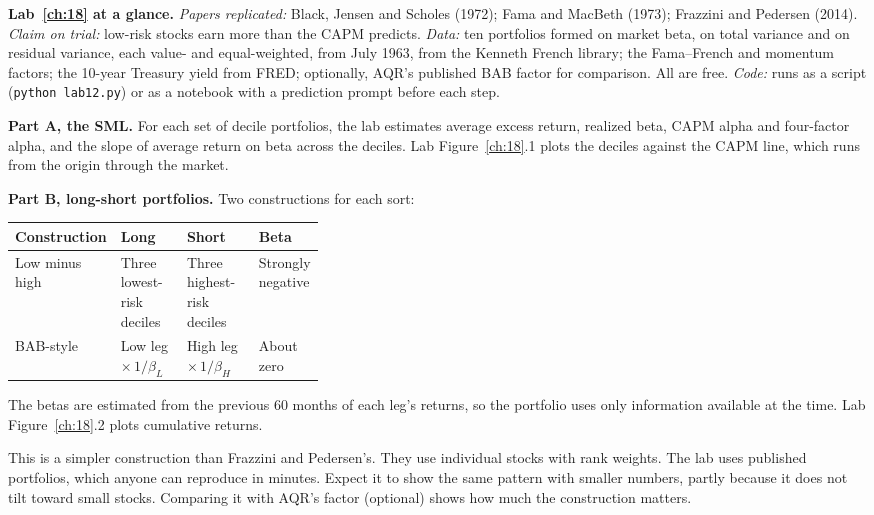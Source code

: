 \begin{callout}
\textbf{Lab~\ref{ch:18} at a glance.} \emph{Papers replicated:} Black, Jensen and Scholes (1972); Fama and MacBeth (1973); Frazzini and Pedersen (2014). \emph{Claim on trial:} low-risk stocks earn more than the CAPM predicts. \emph{Data:} ten portfolios formed on market beta, on total variance and on residual variance, each value- and equal-weighted, from July 1963, from the Kenneth French library; the Fama--French and momentum factors; the 10-year Treasury yield from FRED; optionally, AQR's published BAB factor for comparison. All are free. \emph{Code:} runs as a script (\texttt{python lab12.py}) or as a notebook with a prediction prompt before each step.
\end{callout}

\textbf{Part A, the SML.} For each set of decile portfolios, the lab estimates average excess return, realized beta, CAPM alpha and four-factor alpha, and the slope of average return on beta across the deciles. Lab Figure~\ref{ch:18}.1 plots the deciles against the CAPM line, which runs from the origin through the market.

\textbf{Part B, long-short portfolios.} Two constructions for each sort:

\begin{center}
\small
\begin{tabularx}{0.9\linewidth}{@{}>{\raggedright\arraybackslash}p{0.19\linewidth}>{\raggedright\arraybackslash}X>{\raggedright\arraybackslash}X>{\raggedright\arraybackslash}p{0.17\linewidth}@{}}
\toprule
Construction & Long & Short & Beta \\
\midrule
Low minus high & Three lowest-risk deciles & Three highest-risk deciles & Strongly negative \\
BAB-style & Low leg $\times\, 1/\beta_L$ & High leg $\times\, 1/\beta_H$ & About zero \\
\bottomrule
\end{tabularx}
\end{center}

The betas are estimated from the previous 60 months of each leg's returns, so the portfolio uses only information available at the time. Lab Figure~\ref{ch:18}.2 plots cumulative returns.

This is a simpler construction than Frazzini and Pedersen's. They use individual stocks with rank weights. The lab uses published portfolios, which anyone can reproduce in minutes. Expect it to show the same pattern with smaller numbers, partly because it does not tilt toward small stocks. Comparing it with AQR's factor (optional) shows how much the construction matters.

